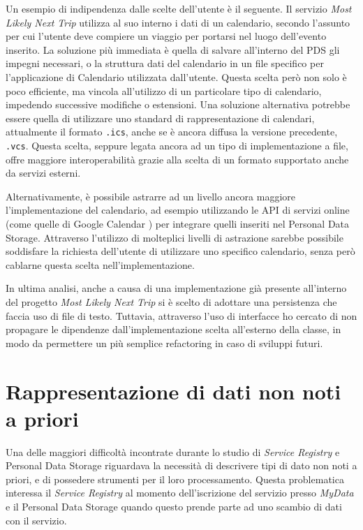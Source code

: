 Un esempio di indipendenza dalle scelte dell’utente \`e il seguente. Il servizio \textit{Most Likely Next Trip} utilizza al suo interno i dati di un calendario, secondo l’assunto per cui l’utente deve compiere un viaggio per portarsi nel luogo dell’evento inserito. La soluzione pi\`u immediata \`e quella di salvare all’interno del PDS gli impegni necessari, o la struttura dati del calendario in un file specifico per l’applicazione di Calendario utilizzata dall’utente. Questa scelta per\`o non solo \`e poco efficiente, ma vincola all’utilizzo di un particolare tipo di calendario, impedendo successive modifiche o estensioni. Una soluzione alternativa potrebbe essere quella di utilizzare uno standard di rappresentazione di calendari, attualmente il formato \texttt{.ics}, anche se \`e ancora diffusa la versione precedente, \texttt{.vcs}. Questa scelta, seppure legata ancora ad un tipo di implementazione a file, offre maggiore interoperabilit\`a grazie alla scelta di un formato supportato anche da servizi esterni.

Alternativamente, \`e possibile astrarre ad un livello ancora maggiore l’implementazione del calendario, ad esempio utilizzando le API di servizi online (come quelle di Google Calendar \cite{googlecalendarapi}) per integrare quelli inseriti nel Personal Data Storage. Attraverso l’utilizzo di molteplici livelli di astrazione sarebbe possibile soddisfare la richiesta dell’utente di utilizzare uno specifico calendario, senza per\`o cablarne questa scelta nell’implementazione.

In ultima analisi, anche a causa di una implementazione gi\`a presente all’interno del progetto \textit{Most Likely Next Trip} si \`e scelto di adottare una persistenza che faccia uso di file di testo. Tuttavia, attraverso l’uso di interfacce ho cercato di non propagare le dipendenze dall’implementazione scelta all’esterno della classe, in modo da permettere un pi\`u semplice refactoring in caso di sviluppi futuri.

\section{Rappresentazione di dati non noti a priori}
\label{sec:A-datinonnotiapriori}
Una delle maggiori difficolt\`a incontrate durante lo studio di \textit{Service Registry} e Personal Data Storage riguardava la necessit\`a di descrivere tipi di dato non noti a priori, e di possedere strumenti per il loro processamento. Questa problematica interessa il \textit{Service Registry} al momento dell’iscrizione del servizio presso \textit{MyData} e il Personal Data Storage quando questo prende parte ad uno scambio di dati con il servizio.


